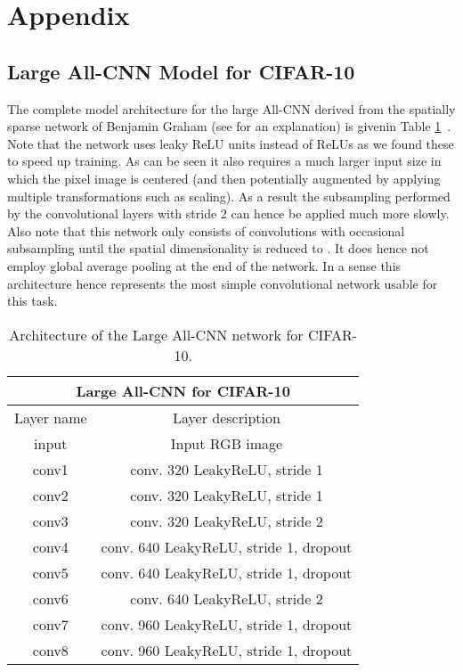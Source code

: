 \documentclass{article} \usepackage{iclr2015,times}
\begin{document}
\section*{Appendix}
\begin{appendix}

\section{Large All-CNN Model for CIFAR-10}
The complete model architecture for the large All-CNN derived from the spatially sparse network of Benjamin Graham (see \citet{Graham2015} for an explanation) is givenin Table \ref{tbl:large_cifar_net}~. Note that the network uses leaky ReLU units instead of ReLUs as we found these to speed up training. As can be seen it also requires a much larger input size in which the  pixel image is centered (and then potentially augmented by applying multiple transformations such as scaling). As a result the subsampling performed by the convolutional layers with stride 2 can hence be applied much more slowly. Also note that this network only consists of  convolutions with occasional subsampling until the spatial dimensionality is reduced to . It does hence not employ global average pooling at the end of the network. In a sense this architecture hence represents the most simple convolutional network usable for this task.
\begin{table}[h]
\caption{Architecture of the Large All-CNN network for CIFAR-10.}
\label{tbl:large_cifar_net}
\begin{center}
\begin{tabular}{c|c}
\multicolumn{2}{c}{\textbf{Large All-CNN for CIFAR-10}} \\ \hline
Layer name & Layer description \\ \hline
input & Input  RGB image\\
conv1 &  conv. 320 LeakyReLU, stride 1\\
conv2 &  conv. 320 LeakyReLU, stride 1\\
conv3 &  conv. 320 LeakyReLU, stride 2\\
conv4 &  conv. 640 LeakyReLU, stride 1, dropout \\
conv5 &  conv. 640 LeakyReLU, stride 1, dropout \\
conv6 &  conv. 640 LeakyReLU, stride 2 \\
conv7 &  conv. 960 LeakyReLU, stride 1, dropout \\
conv8 &  conv. 960 LeakyReLU, stride 1, dropout \\

\end{tabular}
\end{center}
\end{table}
\end{appendix}
\end{document}
